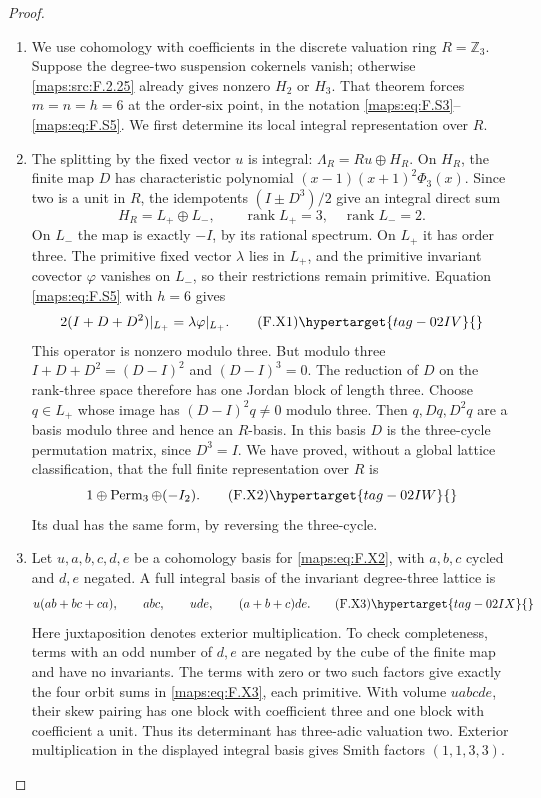 \begin{proof}
\begin{enumerate}[label={$\langle1\rangle$\arabic*.}]
\item We use cohomology with coefficients in the discrete valuation
ring $R=\mathbb Z_3$.  Suppose the degree-two suspension
cokernels vanish; otherwise \ref{maps:src:F.2.25} already gives nonzero
$H_2$ or $H_3$.  That theorem forces $m=n=h=6$ at the
order-six point, in the notation \eqref{maps:eq:F.S3}--\eqref{maps:eq:F.S5}.
We first determine its local integral representation over $R$.

\item The splitting by the fixed vector $u$ is integral:
$\Lambda_R=Ru\oplus H_R$.  On $H_R$, the finite map $D$
has characteristic polynomial
$(x-1)(x+1)^2\Phi_3(x)$.  Since two is a unit in $R$,
the idempotents $(I\pm D^3)/2$ give an integral direct sum
\[
 H_R=L_+\oplus L_-,\qquad
 \operatorname{rank}L_+=3,\quad
 \operatorname{rank}L_-=2.
\]
On $L_-$ the map is exactly $-I$, by its rational spectrum.
On $L_+$ it has order three.  The primitive fixed vector
$\lambda$ lies in $L_+$, and the primitive invariant
covector $\varphi$ vanishes on $L_-$, so their restrictions
remain primitive.  Equation \eqref{maps:eq:F.S5} with $h=6$ gives
\[
 2(I+D+D^2)|_{L_+}=\lambda\varphi|_{L_+}.
 \tag{F.X1}\hypertarget{tag-02IV}{}\label{maps:eq:F.X1}
\]
This operator is nonzero modulo three.  But modulo three
$I+D+D^2=(D-I)^2$ and $(D-I)^3=0$.  The reduction of $D$
on the rank-three space therefore has one Jordan block
of length three.  Choose $q\in L_+$ whose image has
$(D-I)^2q\ne0$ modulo three.  Then $q,Dq,D^2q$ are a
basis modulo three and hence an $R$-basis.  In this basis
$D$ is the three-cycle permutation matrix, since $D^3=I$.
We have proved, without a global lattice classification,
that the full finite representation over $R$ is
\[
                   1\oplus\operatorname{Perm}_3\oplus(-I_2).
 \tag{F.X2}\hypertarget{tag-02IW}{}\label{maps:eq:F.X2}
\]
Its dual has the same form, by reversing the three-cycle.

\item Let $u,a,b,c,d,e$ be a cohomology basis for \eqref{maps:eq:F.X2}, with
$a,b,c$ cycled and $d,e$ negated.  A full integral basis
of the invariant degree-three lattice is
\[
 u(ab+bc+ca),\qquad abc,\qquad ude,\qquad(a+b+c)de.
 \tag{F.X3}\hypertarget{tag-02IX}{}\label{maps:eq:F.X3}
\]
Here juxtaposition denotes exterior multiplication.
To check completeness, terms with an odd number of
$d,e$ are negated by the cube of the finite map and
have no invariants.  The terms with zero or two such
factors give exactly the four orbit sums in \eqref{maps:eq:F.X3},
each primitive.  With volume $uabcde$, their skew
pairing has one block with coefficient three and one
block with coefficient a unit.  Thus its determinant
has three-adic valuation two. Exterior multiplication in the displayed
integral basis gives Smith factors $(1,1,3,3)$.


\end{enumerate}
\end{proof}
